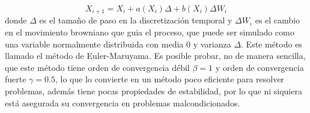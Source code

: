 \documentclass{article}
\begin{document}
\begin{equation}
    X_{i+1}=X_i+a(X_i)\Delta +b(X_i)\Delta W_i
\end{equation}
donde $\Delta$ es el tamaño de paso en la discretización temporal y $\Delta W_i$ es el cambio en el movimiento browniano que guia el proceso, que puede ser simulado como una variable normalmente distribuida con media $0$ y varianza $\Delta$. Este método es llamado el método de Euler-Maruyama. Es posible probar, no de manera sencilla, que este método tiene orden de convergencia débil $\beta=1$ y orden de convergencia fuerte $\gamma=0.5$, lo que lo convierte en un método poco eficiente para resolver problemas, además tiene pocas propiedades de estabilidad, por lo que ni siquiera está asegurada su convergencia en problemas malcondicionados.\\
\end{document}
